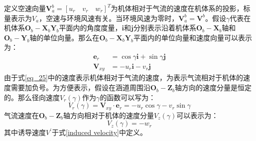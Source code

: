 定义空速向量$\boldsymbol{V}_a^b= [ u_r \quad v_r \quad w_r ]^T$为机体相对于气流的速度在机体系的投影，标量表示为$V_a$，空速与环境风速有关。当环境风速为零时，$\boldsymbol{V}_a^b=\boldsymbol{V}^b$。假设$\gamma$代表在机体系${\boldsymbol{O}_b}-{\boldsymbol{X}_b}{\boldsymbol{Y}_b}$平面内的角度度量，$\boldsymbol{i}$和$\boldsymbol{j}$分别表示沿着机体系${\boldsymbol{O}_b}-{\boldsymbol{X}_b}$轴和${\boldsymbol{O}_b}-{\boldsymbol{Y}_b}轴$的单位向量。那么在${\boldsymbol{O}_b}-{\boldsymbol{X}_b}{\boldsymbol{Y}_b}$平面内的单位向量和速度向量可以表示为：
\begin{align}
    \boldsymbol{e}_{r}&=\cos\gamma\boldsymbol{i}+\sin\gamma\boldsymbol{j} \label{eq_24}\\
    \boldsymbol{V}_{xy}&=-u_r\boldsymbol{i}-v_r\boldsymbol{j} \label{eq_25}
\end{align}
由于式\eqref{eq_25}中的速度表示机体相对于气流的速度，为表示气流相对于机体的速度需要加负号。为方便表示，假设在涵道周围沿${\boldsymbol{O}_b}-{\boldsymbol{Z}_b}$轴方向的速度分量是恒定的。那么径向速度${V}_{r}(\gamma)$作为$\gamma$的函数可以写为：
\begin{equation}
    V_r(\gamma)=\boldsymbol{V}_{xy}\cdot{\boldsymbol{e}}_r=-u_r\cos\gamma-v_r\sin\gamma    \label{eq_26}
\end{equation}
气流速度在${\boldsymbol{O}_b}-{\boldsymbol{Z}_b}$轴方向相对于机体的速度分量$V_z(\gamma)$可以表示为：
\begin{equation}
    V_z(\gamma)=-w_r   \label{eq_27}
\end{equation}
其中诱导速度$V^{\prime}$于式\eqref{induced velocity}中定义。

